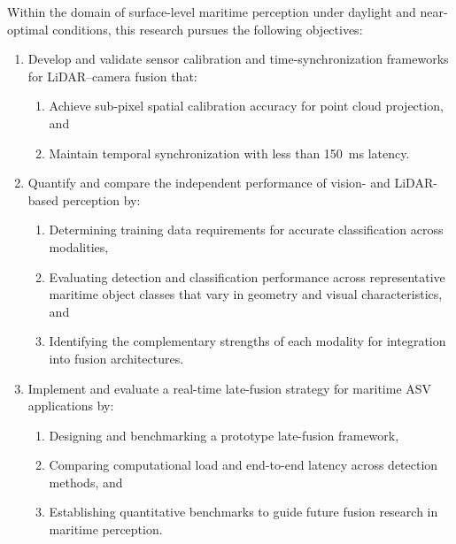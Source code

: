 \documentclass{erauthesis}
\begin{document}
Within the domain of surface-level maritime perception under daylight and near-optimal conditions, this research pursues the following objectives:

\begin{enumerate}
    \item Develop and validate sensor calibration and time-synchronization frameworks for \ac{LiDAR}–camera fusion that:
    \begin{enumerate}
        \item Achieve sub-pixel spatial calibration accuracy for point cloud projection, and
        \item Maintain temporal synchronization with less than 150~ms latency.
    \end{enumerate}

    \item Quantify and compare the independent performance of vision- and \ac{LiDAR}-based perception by:
    \begin{enumerate}
        \item Determining training data requirements for accurate classification across modalities,
        \item Evaluating detection and classification performance across representative maritime object classes that vary in geometry and visual characteristics, and
        \item Identifying the complementary strengths of each modality for integration into fusion architectures.
    \end{enumerate}

    \item Implement and evaluate a real-time late-fusion strategy for maritime \ac{ASV} applications by:
    \begin{enumerate}
        \item Designing and benchmarking a prototype late-fusion framework,
        \item Comparing computational load and end-to-end latency across detection methods, and
        \item Establishing quantitative benchmarks to guide future fusion research in maritime perception.
    \end{enumerate}
\end{enumerate}
\end{document}
